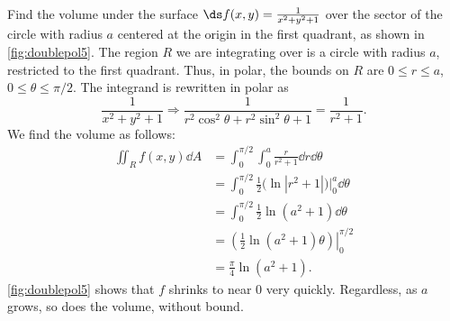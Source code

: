\begin{example}\label{ex_doublepol5}
Find the volume under the surface $\ds f(x,y) =\frac1{x^2+y^2+1}$ over the  sector of the circle with radius $a$ centered at the origin in the first quadrant, as shown in \autoref{fig:doublepol5}.
\solution
{}
%
The region $R$ we are integrating over is a circle with radius $a$, restricted to the first quadrant. Thus, in polar, the bounds on $R$ are $0\leq r\leq a$, $0\leq\theta\leq\pi/2$. The integrand is rewritten in polar as 
\[
\frac{1}{x^2+y^2+1} \Rightarrow
\frac{1}{r^2\cos^2\theta+r^2\sin^2\theta+1} = \frac1{r^2+1}.
\]
We find the volume as follows:
\begin{align*}
\iint_Rf(x,y)\dd A &= \int_0^{\pi/2}\int_0^a\frac{r}{r^2+1}\dd r\dd\theta\\
		&= \int_0^{\pi/2} \frac12\bigl(\ln|r^2+1|\bigr)\Big|_0^a\dd\theta\\
		&=\int_0^{\pi/2} \frac12\ln(a^2+1)\dd\theta\\
		&= \left.\left(\frac12\ln(a^2+1)\theta\right)\right|_0^{\pi/2}\\
		&= \frac{\pi}{4}\ln(a^2+1).
\end{align*}
\autoref{fig:doublepol5}  shows that $f$ shrinks to near 0 very quickly. Regardless, as $a$ grows, so does the volume, without bound. 
\end{example}

